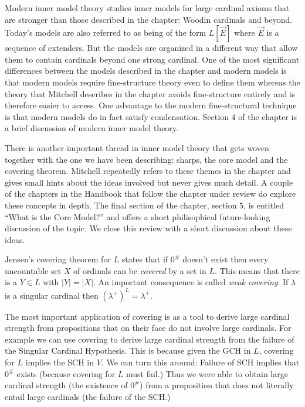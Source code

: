 \documentclass[oneside,12pt]{amsart}
\begin{document}
Modern inner model theory studies inner models for large cardinal axioms that
are stronger than those described in the chapter: Woodin cardinals and beyond.
Today's models are also referred to as being of the form $L[\vec{E}]$ where $\vec{E}$
is a sequence of extenders. But the models are organized in a different way that
allow them to contain cardinals beyond one strong cardinal. One of the most significant
differences between the models described in the chapter and modern models is that
modern models require fine-structure theory even to define them whereas the theory
that Mitchell describes in the chapter avoids fine-structure entirely and is therefore
easier to access. One advantage to the modern fine-structural technique is
that modern models do in fact satisfy condensation. Section 4 of the chapter is
a brief discussion of modern inner model theory.

There is another important thread in inner model theory that gets woven together with
the one we have been describing: sharps, the core model and the covering theorem.
Mitchell repeatedly refers to these themes in the chapter and gives small hints about
the ideas involved but never gives much detail. A couple of the chapters in the
Handbook that follow the chapter under review do explore these concepts in depth.
The final section of the chapter, section 5, is entitled ``What is the Core Model?''
and offers a short philisophical future-looking discussion of the topic.
We close this review with a short discussion about these ideas.

Jensen's covering theorem for $L$ states that if $0^{\#}$ doesn't exist then every
uncountable set $X$ of ordinals can be \emph{covered} by a set in $L$. This means
that there is a $Y\in L$ with $|Y| = |X|$. An important consequence is called
\emph{weak covering}: If $\lambda$ is a singular cardinal then $(\lambda^{+})^L=\lambda^{+}$.

The most important application of covering is as a tool to derive large cardinal
strength from propositions that on their face do not involve large cardinals.
For example we can use covering to derive large cardinal strength from the failure of the
Singular Cardinal Hypothesis. This is because given the GCH in $L$, covering
for $L$ implies the SCH in $V$. We can turn this around: Failure of SCH implies
that $0^{\#}$ exists (because covering for $L$ must fail.) Thus we were able to
obtain large cardinal strength (the existence of $0^{\#}$) from a proposition that
does not literally entail large cardinals (the failure of the SCH.)
\end{document}
